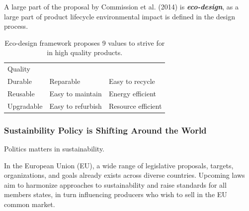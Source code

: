 \documentclass[
  letterpaper,
  DIV=11,
  numbers=noendperiod]{scrartcl}
\begin{document}
A large part of the proposal by Commission et al. (2014) is
\textbf{\emph{eco-design}}, as a large part of product lifecycle
environmental impact is defined in the design process.

\begin{longtable}[]{@{}lll@{}}
\caption{Eco-design framework proposes 9 values to strive for in high
quality products.}\tabularnewline
\toprule\noalign{}
\endfirsthead
\endhead
\bottomrule\noalign{}
\endlastfoot
Quality & & \\
Durable & Reparable & Easy to recycle \\
Reusable & Easy to maintain & Energy efficient \\
Upgradable & Easy to refurbish & Resource efficient \\
\end{longtable}

\subsubsection{Sustainbility Policy is Shifting Around the
World}\label{sustainbility-policy-is-shifting-around-the-world}

Politics matters in sustainability.

In the European Union (EU), a wide range of legislative proposals,
targets, organizations, and goals already exists across diverse
countries. Upcoming laws aim to harmonize approaches to sustainability
and raise standards for all members states, in turn influencing
producers who wish to sell in the EU common market.
\end{document}

